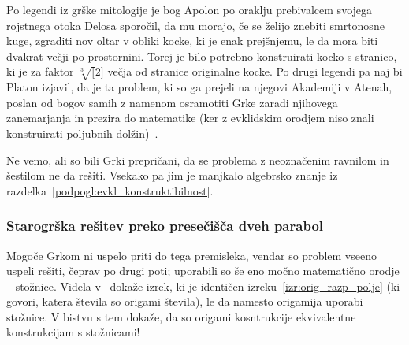 Po legendi iz grške mitologije je bog Apolon po oraklju prebivalcem svojega rojstnega otoka Delosa sporočil, da mu morajo, če se želijo znebiti smrtonosne kuge, zgraditi nov oltar v obliki kocke, ki je enak prejšnjemu, le da mora biti dvakrat večji po prostornini. Torej je bilo potrebno konstruirati kocko s stranico, ki je za faktor $\sqrt[3][2]$ večja od stranice originalne kocke. Po drugi legendi pa naj bi Platon izjavil, da je ta problem, ki so ga prejeli na njegovi Akademiji v Atenah, poslan od bogov samih z namenom osramotiti Grke zaradi njihovega zanemarjanja in prezira do matematike (ker z evklidskim orodjem niso znali konstruirati poljubnih dolžin)~\cite[str.\ 29]{geometricconstructions}.

Ne vemo, ali so bili Grki prepričani, da se problema z neoznačenim ravnilom in šestilom ne da rešiti. Vsekako pa jim je manjkalo algebrsko znanje iz razdelka~\ref{podpogl:evkl_konstruktibilnost}.

\subsubsection*{Starogrška rešitev preko presečišča dveh parabol}

Mogoče Grkom ni uspelo priti do tega premisleka, vendar so problem vseeno uspeli rešiti, čeprav po drugi poti; uporabili so še eno močno matematično orodje -- stožnice. Videla v~\cite{videla1997} dokaže izrek, ki je identičen izreku~\ref{izr:orig_razp_polje} (ki govori, katera števila so origami števila), le da namesto origamija uporabi stožnice. V bistvu s tem dokaže, da so origami kosntrukcije ekvivalentne konstrukcijam s stožnicami!


